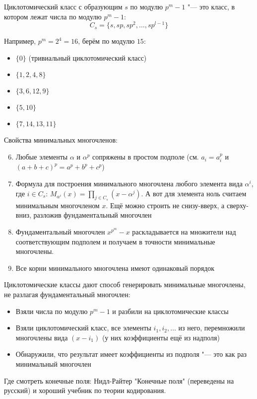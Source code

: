 \begin{Def}
Циклотомический класс с образующим $s$ по модулю $p^m-1$ "--- это
класс, в котором лежат числа по модулю $p^m-1$:
\[
C_s = \{s, sp, sp^2, \dots, sp^{l-1}\}
\]
\end{Def}
\begin{exmp}
Например, $p^m=2^4=16$, берём по модулю $15$:
\begin{itemize}
\item $\{0\}$ (тривиальный циклотомический класс)
\item $\{1,2,4,8\}$
\item $\{3,6,12,9\}$
\item $\{5,10\}$
\item $\{7,14,13,11\}$
\end{itemize}
\end{exmp}

\begin{Rem}
	Свойства минимальных многочленов:
	\begin{enumerate}
	\setcounter{enumi}{5}
	\item Любые элементы $\alpha$ и $\alpha^p$ сопряжены в простом подполе
		(см. $a_i=a_i^p$ и $(a+b+c)^p=a^p+b^p+c^p$)
	\item Формула для построения минимального многочлена любого элемента
		вида $\alpha^i$, где $i \in C_s$:
		$M_{\alpha^i}(x) = \prod_{j\in C_s} (x-\alpha^j)$.
		А вот для элемента ноль считаем минимальным многочленом $x$.
		Ещё можно строить не снизу-вверх, а сверху-вниз, разложив
		фундаментальный многочлен 
	\item Фундаментальный многочлен $x^{p^m}-x$ раскладывается
	    на множители над соответствующим подполем и получаем в точности
	    минимальные многочлены.
	\setcounter{enumi}{10}
	\item Все корни минимального многочлена имеют одинаковый порядок
	\end{enumerate}
\end{Rem}
\begin{conseq}
	Циклотомические классы дают способ генерировать минимальные многочлены, не разлагая фундаментальный многочлен:
	\begin{itemize}
	\item Взяли числа по модулю $p^m-1$ и разбили на циклотомические классы
	\item Взяли циклотомический класс, все элементы $i_1, i_2, \dots$ из него, перемножили
		многочлены вида $(x-i_1)$ (у них коэффициенты ещё из надполя)
	\item
		Обнаружили, что результат имеет коэффициенты из подполя "--- это как раз минимальный многочлен
	\end{itemize}
\end{conseq}

Где смотреть конечные поля: Нидл-Райтер "Конечные поля" (переведены на русский)
и хороший учебник по теории кодирования.
